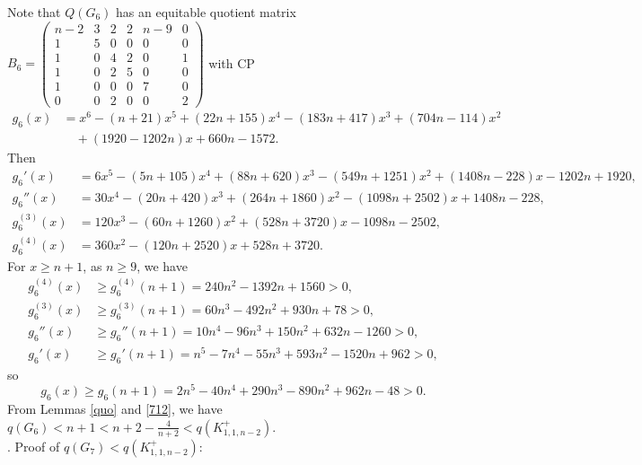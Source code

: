 \documentclass[12pt]{article}
\begin{document}
\begin{appendices}
Note that  $Q(G_6)$ has an equitable quotient matrix
$B_6=
\left(\begin{smallmatrix}
n-2  & 3 & 2 & 2 & n-9 & 0\\
1  &5 &0 &0 &0 &0\\
1  &0 &4 &2 &0 &1\\
1  &0 &2 &5 &0 &0\\
1  &0 &0 &0 &7 &0\\
0  &0 &2 &0 &0 &2
\end{smallmatrix}\right)$
with CP
\begin{align*}
g_6(x)&=x^6 -( n + 21)x^5 + (22n + 155)x^4 - ( 183n + 417)x^3 + (704n - 114)x^2\\
& \quad + (1920 - 1202n)x + 660n - 1572.
\end{align*}
Then
\begin{align*}
g_6'(x)&=6x^5 -( 5n + 105)x^4 + (88n + 620)x^3 - ( 549n + 1251)x^2 + (1408n - 228)x - 1202n + 1920,\\
g_6''(x)&=30x^4 - ( 20n + 420)x^3 + (264n + 1860)x^2 - ( 1098n + 2502)x + 1408n - 228,\\
g_6^{(3)}(x)&=120x^3 - ( 60n + 1260)x^2 + (528n + 3720)x - 1098n - 2502,\\
g_6^{(4)}(x)&=360x^2 - ( 120n + 2520)x + 528n + 3720.
\end{align*}
For  $x\ge n+1$, as $n\ge 9$, we have
\begin{align*}
g_6^{(4)}(x)&\ge g_6^{(4)}(n+1)=240n^2 - 1392n + 1560>0,\\
g_6^{(3)}(x)&\ge g_6^{(3)}(n+1)=60n^3 - 492n^2 + 930n + 78>0,\\
g_6''(x)&\ge g_6''(n+1)=10n^4 - 96n^3 + 150n^2 + 632n - 1260>0,\\
g_6'(x)&\ge g_6'(n+1)=n^5 - 7n^4 - 55n^3 + 593n^2 - 1520n + 962>0,
\end{align*}
so
\[
g_6(x)\ge g_6(n+1)=2n^5 - 40n^4 + 290n^3 - 890n^2 + 962n - 48>0.
\]
From Lemmas \ref{quo} and \ref{712}, we have $q(G_6)<n+1<n+2-\frac{4}{n+2}<q(K_{1,1,n-2}^+)$.\\


. Proof of  $q(G_{7})<q(K_{1,1,n-2}^+)$:



\end{appendices}
\end{document}
